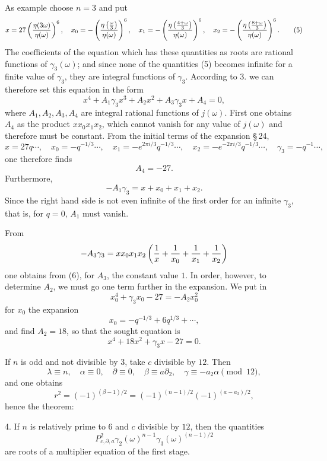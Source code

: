 \documentclass[11pt]{article}
\begin{document}
As example choose $n=3$ and put
\begin{equation}
 x=27\left({\eta(3\omega)\over\eta(\omega)}\right)^6,
\quad
x_0=-\left({\eta\left({\omega\over3}\right)\over\eta(\omega)}\right)^6,
\quad
x_1=-\left({\eta\left({4+\omega\over3}\right)\over\eta(\omega)}\right)^6,
\quad
x_2=-\left({\eta\left({8+\omega\over3}\right)\over\eta(\omega)}\right)^6.
\tag{5}
\end{equation}
The coefficients of the equation which has these quantities as roots are rational functions of $\gamma_3(\omega)$; and since none of the quantities (5) becomes infinite for a finite value of $\gamma_3$, they are integral functions of $\gamma_3$. According to 3. we can therefore set this equation in the form
\[
 x^4+A_1\gamma_3x^3+A_2x^2+A_3\gamma_3x+A_4=0,
\]
where $A_1,A_2,A_3,A_4$ are integral rational functions of $j(\omega)$. First one obtains $A_4$ as the product $xx_0x_1x_2$, which cannot vanish for any value of $j(\omega)$ and therefore must be constant. From the initial terms of the expansion \S\,24,
\begin{equation}
 x=27q\cdots,
 \quad x_0=-q^{-1/3}\cdots,
 \quad x_1=-e^{2\pi i/3}q^{-1/3}\cdots,
 \quad x_2=-e^{-2\pi i/3}q^{-1/3}\cdots,
 \quad \gamma_3=-q^{-1}\cdots,
\tag{6}
\end{equation}
one therefore finds
\[
 A_4=-27.
\]
Furthermore,
\[
 -A_1\gamma_3=x+x_0+x_1+x_2.
\]
Since the right hand side is not even infinite of the first order for an infinite $\gamma_3$, that is, for $q=0$, $A_1$ must vanish.

From
\[
 -A_3\gamma_3=xx_0x_1x_2\left({1\over x}+{1\over x_0}+{1\over x_1}+{1\over x_2}\right)
\]
one obtains from (6), for $A_3$, the constant value $1$. In order, however, to determine $A_2$, we must go one term further in the expansion. We put in
\[
 x_0^4+\gamma_3x_0-27=-A_2x_0^2
\]
for $x_0$ the expansion
\[
 x_0=-q^{-1/3}+6q^{1/3}+\cdots,
\]
and find $A_2=18$, so that the sought equation is
\begin{equation}
 x^4+18x^2+\gamma_3x-27=0.
\tag{7}
\end{equation}

If $n$ is odd and not divisible by $3$, take $c$ divisible by $12$. Then
\[
 \lambda\equiv n,
 \quad \alpha\equiv0,
 \quad \partial\equiv0,
 \quad \beta\equiv a\partial_2,
 \quad \gamma\equiv-a_2\alpha
 \pmod {12},
\]
and one obtains
\[
 r^2=(-1)^{(\beta-1)/2}=(-1)^{(n-1)/2}(-1)^{(a-a_2)/2},
\]
hence the theorem:

4. If $n$ is relatively prime to $6$ and $c$ divisible by $12$, then the quantities
\[
 P_{c,\partial,a}^{2}\gamma_2(\omega)^{n-1}\gamma_3(\omega)^{(n-1)/2}
\]
are roots of a multiplier equation of the first stage.
\end{document}
